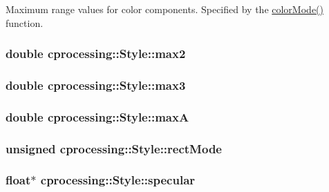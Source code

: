 \-Maximum range values for color components. \-Specified by the \hyperlink{namespacecprocessing_aa2b11af6c6cb096d02a9fb39b6f5a54d}{color\-Mode()} function. \hypertarget{classcprocessing_1_1Style_ab398d4a05ab2a554d5856f6394a3908c}{
\subsubsection[{max2}]{\setlength{\rightskip}{0pt plus 5cm}double {\bf cprocessing\-::\-Style\-::max2}}}\label{classcprocessing_1_1Style_ab398d4a05ab2a554d5856f6394a3908c}
\hypertarget{classcprocessing_1_1Style_addd5a8e8c0b252f452a0a20f37db4976}{
\subsubsection[{max3}]{\setlength{\rightskip}{0pt plus 5cm}double {\bf cprocessing\-::\-Style\-::max3}}}\label{classcprocessing_1_1Style_addd5a8e8c0b252f452a0a20f37db4976}
\hypertarget{classcprocessing_1_1Style_a6c84aee2964e963e5d4a398fecb6820e}{
\subsubsection[{max\-A}]{\setlength{\rightskip}{0pt plus 5cm}double {\bf cprocessing\-::\-Style\-::max\-A}}}\label{classcprocessing_1_1Style_a6c84aee2964e963e5d4a398fecb6820e}
\hypertarget{classcprocessing_1_1Style_ad6c53e0b11b150ce9b0d4cda838b21a0}{
\subsubsection[{rect\-Mode}]{\setlength{\rightskip}{0pt plus 5cm}unsigned {\bf cprocessing\-::\-Style\-::rect\-Mode}}}\label{classcprocessing_1_1Style_ad6c53e0b11b150ce9b0d4cda838b21a0}
\hypertarget{classcprocessing_1_1Style_a87b9759761331ce9d9e6f1f1fef6943f}{
\subsubsection[{specular}]{\setlength{\rightskip}{0pt plus 5cm}float$\ast$ {\bf cprocessing\-::\-Style\-::specular}}}\label{classcprocessing_1_1Style_a87b9759761331ce9d9e6f1f1fef6943f}
